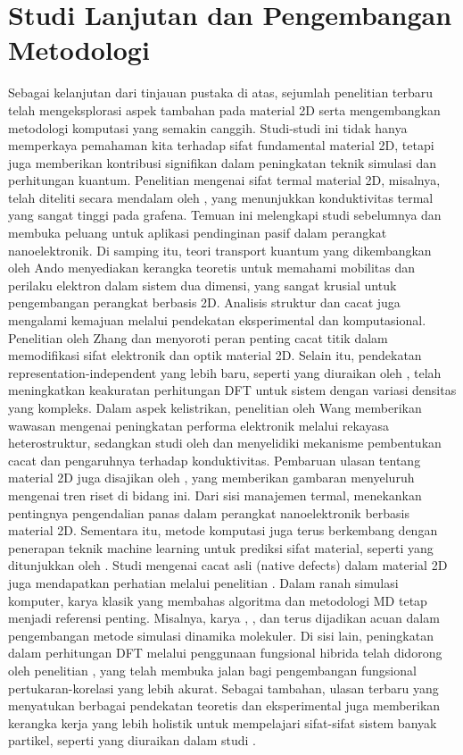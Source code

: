 \section{Studi Lanjutan dan Pengembangan Metodologi}
Sebagai kelanjutan dari tinjauan pustaka di atas, sejumlah penelitian terbaru telah mengeksplorasi aspek tambahan pada material 2D serta mengembangkan metodologi komputasi yang semakin canggih. Studi-studi ini tidak hanya memperkaya pemahaman kita terhadap sifat fundamental material 2D, tetapi juga memberikan kontribusi signifikan dalam peningkatan teknik simulasi dan perhitungan kuantum. Penelitian mengenai sifat termal material 2D, misalnya, telah diteliti secara mendalam oleh \citep{Khan2017}, yang menunjukkan konduktivitas termal yang sangat tinggi pada grafena. Temuan ini melengkapi studi sebelumnya dan membuka peluang untuk aplikasi pendinginan pasif dalam perangkat nanoelektronik. Di samping itu, teori transport kuantum yang dikembangkan oleh Ando \citep{ando2002} menyediakan kerangka teoretis untuk memahami mobilitas dan perilaku elektron dalam sistem dua dimensi, yang sangat krusial untuk pengembangan perangkat berbasis 2D. Analisis struktur dan cacat juga mengalami kemajuan melalui pendekatan eksperimental dan komputasional. Penelitian oleh Zhang \citep{Zhang2020} dan \citep{Slotman2013} menyoroti peran penting cacat titik dalam memodifikasi sifat elektronik dan optik material 2D. Selain itu, pendekatan representation-independent yang lebih baru, seperti yang diuraikan oleh \citep{Shen2022}, telah meningkatkan keakuratan perhitungan DFT untuk sistem dengan variasi densitas yang kompleks. Dalam aspek kelistrikan, penelitian oleh Wang \citep{Wang2017} memberikan wawasan mengenai peningkatan performa elektronik melalui rekayasa heterostruktur, sedangkan studi oleh \citep{Munro2020} dan \citep{Huang2012} menyelidiki mekanisme pembentukan cacat dan pengaruhnya terhadap konduktivitas. Pembaruan ulasan tentang material 2D juga disajikan oleh \citep{Bhimanapati2016}, yang memberikan gambaran menyeluruh mengenai tren riset di bidang ini. Dari sisi manajemen termal, \citep{Khan2017} menekankan pentingnya pengendalian panas dalam perangkat nanoelektronik berbasis material 2D. Sementara itu, metode komputasi juga terus berkembang dengan penerapan teknik machine learning untuk prediksi sifat material, seperti yang ditunjukkan oleh \citep{Zheng2025}. Studi mengenai cacat asli (native defects) dalam material 2D juga mendapatkan perhatian melalui penelitian \citep{Weston2018}. Dalam ranah simulasi komputer, karya klasik yang membahas algoritma dan metodologi MD tetap menjadi referensi penting. Misalnya, karya \citep{Allen1989}, \citep{Rapaport2004}, dan \citep{Allen1989} terus dijadikan acuan dalam pengembangan metode simulasi dinamika molekuler. Di sisi lain, peningkatan dalam perhitungan DFT melalui penggunaan fungsional hibrida telah didorong oleh penelitian \citep{Becke1993}, yang telah membuka jalan bagi pengembangan fungsional pertukaran-korelasi yang lebih akurat. Sebagai tambahan, ulasan terbaru yang menyatukan berbagai pendekatan teoretis dan eksperimental juga memberikan kerangka kerja yang lebih holistik untuk mempelajari sifat-sifat sistem banyak partikel, seperti yang diuraikan dalam studi \citep{Lele2022}. 